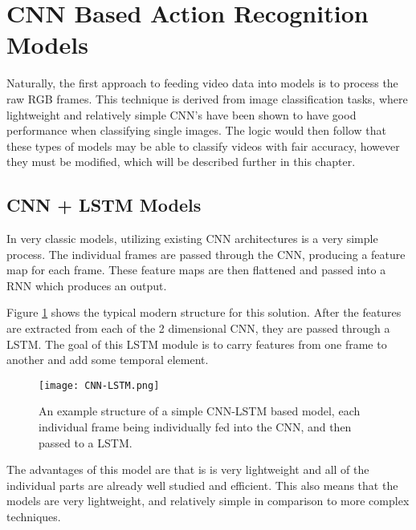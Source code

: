 \section{CNN Based Action Recognition Models}

Naturally, the first approach to feeding video data into models is to process the raw RGB frames. This technique is derived from image classification tasks, where lightweight and relatively simple CNN's have been shown to have good performance when classifying single images. The logic would then follow that these types of models may be able to classify videos with fair accuracy, however they must be modified, which will be described further in this chapter.

\subsection{CNN + LSTM Models}

In very classic models, utilizing existing CNN architectures is a very simple process. The individual frames are passed through the CNN, producing a feature map for each frame. These feature maps are then flattened and passed into a RNN which produces an output.

Figure \ref{fig:cnn-lstm} shows the typical modern structure for this solution. After the features are extracted from each of the 2 dimensional CNN, they are passed through a LSTM. The goal of this LSTM module is to carry features from one frame to another and add some temporal element.

\begin{figure}[ht]
	\texttt{[image: CNN-LSTM.png]}
	\centering
	\caption{An example structure of a simple CNN-LSTM based model, each individual frame being individually fed into the CNN, and then passed to a LSTM.}
	\label{fig:cnn-lstm}
\end{figure}

The advantages of this model are that is is very lightweight and all of the individual parts are already well studied and efficient. This also means that the models are very lightweight, and relatively simple in comparison to more complex techniques.


